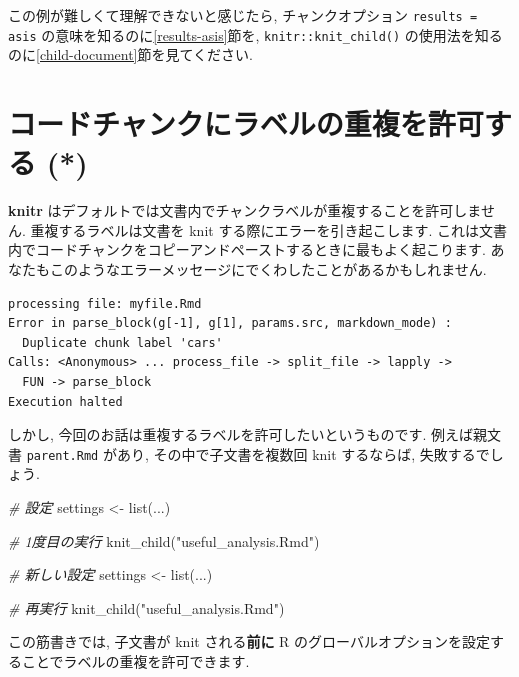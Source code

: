 \documentclass[
  11pt,
]{bxjsreport}
\newenvironment{Shaded}{\begin{snugshade}}{\end{snugshade}}
\newcommand{\CommentTok}[1]{\textcolor[rgb]{0.56,0.35,0.01}{\textit{#1}}}
\newcommand{\FunctionTok}[1]{\textcolor[rgb]{0.00,0.00,0.00}{#1}}
\newcommand{\NormalTok}[1]{#1}
\newcommand{\OtherTok}[1]{\textcolor[rgb]{0.56,0.35,0.01}{#1}}
\newcommand{\StringTok}[1]{\textcolor[rgb]{0.31,0.60,0.02}{#1}}
\begin{document}
この例が難しくて理解できないと感じたら, チャンクオプション \texttt{results = \textquotesingle{}asis\textquotesingle{}} の意味を知るのに\ref{results-asis}節を, \texttt{knitr::knit\_child()} の使用法を知るのに\ref{child-document}節を見てください.

\hypertarget{duplicate-label}{%
\section{コードチャンクにラベルの重複を許可する (*)}\label{duplicate-label}}

\textbf{knitr} はデフォルトでは文書内でチャンクラベルが重複することを許可しません. 重複するラベルは文書を knit する際にエラーを引き起こします. これは文書内でコードチャンクをコピーアンドペーストするときに最もよく起こります. あなたもこのようなエラーメッセージにでくわしたことがあるかもしれません.

\begin{verbatim}
processing file: myfile.Rmd
Error in parse_block(g[-1], g[1], params.src, markdown_mode) :
  Duplicate chunk label 'cars'
Calls: <Anonymous> ... process_file -> split_file -> lapply ->
  FUN -> parse_block
Execution halted
\end{verbatim}

しかし, 今回のお話は重複するラベルを許可したいというものです. 例えば親文書 \texttt{parent.Rmd} があり, その中で子文書を複数回 knit するならば, 失敗するでしょう.

\begin{Shaded}
\begin{Highlighting}[numbers=left,,]
\CommentTok{\# 設定}
\NormalTok{settings }\OtherTok{\textless{}{-}} \FunctionTok{list}\NormalTok{(...)}

\CommentTok{\# 1度目の実行}
\FunctionTok{knit\_child}\NormalTok{(}\StringTok{"useful\_analysis.Rmd"}\NormalTok{)}

\CommentTok{\# 新しい設定}
\NormalTok{settings }\OtherTok{\textless{}{-}} \FunctionTok{list}\NormalTok{(...)}

\CommentTok{\# 再実行}
\FunctionTok{knit\_child}\NormalTok{(}\StringTok{"useful\_analysis.Rmd"}\NormalTok{)}
\end{Highlighting}
\end{Shaded}

この筋書きでは, 子文書が knit される\textbf{前に} R のグローバルオプションを設定することでラベルの重複を許可できます.
\end{document}
